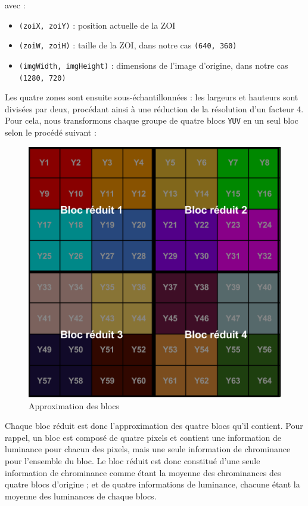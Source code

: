 \documentclass[11pt,a4paper]{article}
\begin{document}
\bigbreak
avec :
\begin{itemize}
\item{\texttt{(zoiX, zoiY)} : position actuelle de la ZOI}
\item{\texttt{(zoiW, zoiH)} : taille de la ZOI, dans notre cas \texttt{(640, 360)}}
\item{\texttt{(imgWidth, imgHeight)} : dimensions de l'image d'origine, dans notre cas \texttt{(1280, 720)}}
\end{itemize}

\bigbreak
Les quatre zones sont ensuite sous-échantillonnées : les largeurs et hauteurs sont divisées par deux, procédant ainsi à une réduction de la résolution d'un facteur 4.
Pour cela, nous transformons chaque groupe de quatre blocs \texttt{YUV} en un seul bloc selon le procédé suivant :

\begin{figure}[H]
\begin{center}
\includegraphics[scale=0.5]{images/yuv3.png}
\end{center}
\caption{Approximation des blocs}
\label{}
\end{figure}

\bigbreak

Chaque bloc réduit est donc l'approximation des quatre blocs qu'il contient.
Pour rappel, un bloc est composé de quatre pixels et contient une information de luminance pour chacun des pixels, mais une seule information de chrominance pour l'ensemble du bloc.
Le bloc réduit est donc constitué d'une seule information de chrominance comme étant la moyenne des chrominances des quatre blocs d'origine ; et de quatre informations de luminance, chacune étant la moyenne des luminances de chaque blocs.
\end{document}
